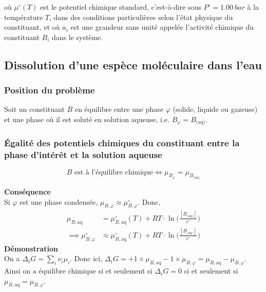 \documentclass{article}
\newcommand{\Dr}{\Delta_{\mathrm{r}}}
\begin{document}
où $\mu^\circ(T)$ est le potentiel chimique standard, c'est-à-dire sous $P^\circ = \SI{1,00}{bar}$ à la température $T$, dans des conditions particulières selon l'état physique du constituant, et où $a_i$ est une grandeur sans unité appelée l'activité chimique du constituant $B_i$ dans le système.

\subsection{Dissolution d'une espèce moléculaire dans l'eau}
\subsubsection{Position du problème}
Soit un constituant $B$ en équilibre entre une phase $\varphi$ (solide, liquide ou gazeuse) et une phase où il est soluté en solution aqueuse, i.e. $B_\varphi = B_{\text{(aq)}}$.
\subsubsection{Égalité des potentiels chimiques du constituant entre la phase d'intérêt et la solution aqueuse}
\begin{tableau}
    \begin{enonce}
    $$\text{$B$ est à l'équilibre chimique} \iff \mu_{B_\varphi} = \mu_{B_{\text{(aq)}}}$$
\end{enonce}
\textbf{Conséquence}\\
Si $\varphi$ est une phase condensée, $\mu_{B,\varphi} \approx \mu^\circ_{B,\varphi}$. Donc,
    \begin{align*}
        \mu_{B,\text{aq}} &= \mu_{B,\text{aq}}^\circ(T) + RT\cdot\ln\bigg(\frac{[B_{\text{(aq)}}]}{c^\circ}\bigg)\\
        \implies \mu_{B,\varphi}^\circ &\approx \mu_{B,\text{aq}}^\circ(T) + RT\cdot\ln\bigg(\frac{[B_{\text{(aq)}}]}{c^\circ}\bigg)
    \end{align*}
\tcbline
\textbf{Démonstration}\\
On a $\Dr G = \sum_i \nu_i \mu_i$. Donc ici, $\Dr G = +1\times \mu_{B,\text{aq}} - 1\times \mu_{B,\varphi} = \mu_{B,\text{aq}} - \mu_{B,\varphi}$.\\
Ainsi on a équilibre chimique si et seulement si $\Dr G = 0$ si et seulement si $\mu_{B,\text{aq}} = \mu_{B,\varphi}$.
\end{tableau}
\end{document}

